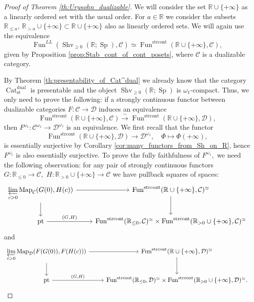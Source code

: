 \documentclass[11pt,leqno]{amsart}
\numberwithin{equation}{section}
\def\R{\mathbb{R}}
\def\Map{\operatorname{Map}}
\newcommand{\prolim}[1][]{\mathop{\varprojlim}\limits_{#1}}
\newcommand{\xto}{\xrightarrow}
\newcommand{\Cat}{\operatorname{Cat}}
\newcommand{\strcont}{\operatorname{strcont}}
\newcommand{\st}{\operatorname{st}}
\newcommand{\dual}{\operatorname{dual}}
\newcommand{\cD}{{\mathcal D}}
\newcommand{\cC}{{\mathcal C}}
\newcommand{\Fun}{\operatorname{Fun}}
\newcommand{\Sh}{\operatorname{Shv}}
\newcommand{\Shv}{\operatorname{Shv}}
\newcommand{\Sp}{\operatorname{Sp}}
\newcommand{\pt}{\operatorname{pt}}
\begin{document}
\begin{proof}[Proof of Theorem \ref{th:Urysohn_dualizable}]
	We will consider the set $\R\cup\{+\infty\}$ as a linearly ordered set with the usual order. For $a\in\R$ we consider the subsets $\R_{\leq a},\,\R_{>a}\cup\{+\infty\}\subset \R\cup\{+\infty\}$ also as linearly ordered sets. We will again use the equivalence 
	$$\Fun^{LL}(\Sh_{\geq 0}(\R;\Sp),\cC)\simeq \Fun^{\strcont}(\R\cup\{+\infty\},\cC),$$
	given by Proposition \ref{prop:Stab_cont_of_cont_posets}, where $\cC$ is a dualizable category. 
	
	By Theorem \ref{th:presentability_of_Cat^dual} we already know that the category $\Cat_{\st}^{\dual}$ is presentable and the object $\Shv_{\geq 0}(\R;\Sp)$ is $\omega_1$-compact. Thus, we only need to prove the following: if a strongly continuous functor between dualizable categories $F:\cC\to\cD$ induces an equivalence
	\begin{equation}\label{eq:Fun_from_Sh_geq_0_to_F}
	\Fun^{\strcont}(\R\cup\{+\infty\},\cC)\xto{\sim} \Fun^{\strcont}(\R\cup\{+\infty\},\cD),
	\end{equation}
	then $F^{\omega_1}:\cC^{\omega_1}\to\cD^{\omega_1}$ is an equivalence. We first recall that the functor $$\Fun^{\strcont}(\R\cup\{+\infty\},\cD)\to\cD^{\omega_1},\quad \Phi\mapsto\Phi(+\infty),$$ is essentially surjective by Corollary \ref{cor:many_functors_from_Sh_on_R}, hence $F^{\omega_1}$ is also essentially surjective. To prove the fully faithfulness of $F^{\omega_1},$ we need the following observation: for any pair of strongly continuous functors $G:\R_{\leq 0}\to \cC,$ $H:\R_{>0}\cup\{+\infty\}\to\cC$ we have pullback squares of spaces:
	\begin{equation*}
	\begin{tikzcd}
	\prolim[c>0]\Map_{\cC}(G(0),H(c))\ar[r]\ar[d] & \Fun^{\strcont}(\R\cup\{+\infty\},\cC)^{\simeq}\ar[d]\\
	\pt\ar{r}{(G,H)} & \Fun^{\strcont}(\R_{\leq 0},\cC)^{\simeq}\times\Fun^{\strcont}(\R_{>0}\cup\{+\infty\},\cC)^{\simeq}
	\end{tikzcd}
	\end{equation*}
	and
	\begin{equation*}
		\begin{tikzcd}
			\prolim[c>0]\Map_{\cD}(F(G(0)),F(H(c)))\ar[r]\ar[d] & \Fun^{\strcont}(\R\cup\{+\infty\},\cD)^{\simeq}\ar[d]\\
			\pt\ar{r}{(G,H)} & \Fun^{\strcont}(\R_{\leq 0},\cD)^{\simeq}\times\Fun^{\strcont}(\R_{>0}\cup\{+\infty\},\cD)^{\simeq}.
		\end{tikzcd}

\end{equation*}
\end{proof}
\end{document}
